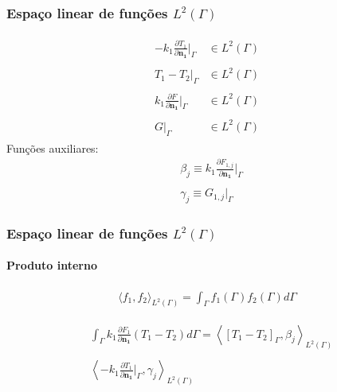 \documentclass{beamer}
\begin{document}
\begin{frame}
	\frametitle{Espaço linear de funções $L^2(\Gamma)$}
	
	\begin{align*}
		\begin{array}{ll}
			-k_1 \displaystyle \frac{\partial T_1}{\partial\mathbf{n_1}}\bigg|_\Gamma & \in L^2(\Gamma) \\ \\		
			T_1 - T_2|_\Gamma & \in L^2(\Gamma)\\ \\
			k_1 \displaystyle\frac{\partial F}{\partial\mathbf{n_1}}\bigg|_\Gamma & \in L^2(\Gamma) \\ \\
			G|_\Gamma & \in L^2(\Gamma)			
		\end{array}
	\end{align*}
	\pause
	Funções auxiliares:
	\begin{align*}
	& \beta_j \equiv k_1 \frac{\partial F_{1,j}}{\partial\mathbf{n_1}}\bigg|_\Gamma \\ \\
	& \gamma_j \equiv G_{1,j}\big|_\Gamma
	\end{align*}
\end{frame}

\begin{frame}
	\frametitle{Espaço linear de funções $L^2(\Gamma)$}
	\framesubtitle{Produto interno}
	
	\begin{definition}
		\begin{align*}
			\langle f_1, f_2\rangle_{L^2(\Gamma)} = \int_\Gamma f_1(\Gamma) f_2(\Gamma) d\Gamma			
		\end{align*} 
	\end{definition}
	
	\begin{align*}
	& \int_\Gamma k_1 \frac{\partial F_1}{\partial\mathbf{n_1}}\left(T_1 - T_2\right)d\Gamma
	=
	\left\langle \left[T_1 - T_2\right]_\Gamma, \beta_j\right\rangle _{L^2(\Gamma)} \\ \nonumber \\
	&
	\left\langle  -k_1 \frac{\partial T_1}{\partial\mathbf{n_1}}\bigg|_\Gamma, \gamma_j\right\rangle _{L^2(\Gamma)}
	\end{align*} 
\end{frame}
\end{document}
